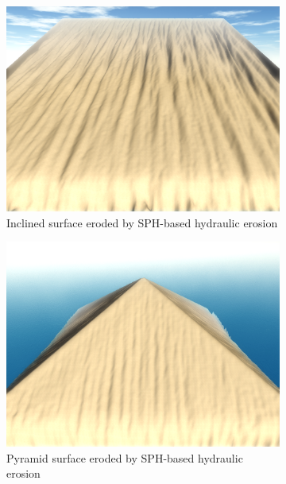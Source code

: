 \documentclass[11pt,a4paper,twoside,openright]{report}
\begin{document}
\begin{figure}[h]
  \centering
  \begin{subfigure}[b]{0.32\textwidth}
    \includegraphics[width=\textwidth]{sph-hydro-10mins-crooked.png}
    \caption{Inclined surface eroded by SPH-based hydraulic erosion}
    \label{fig:hydro4}
  \end{subfigure}
  \begin{subfigure}[b]{0.32\textwidth}
    \includegraphics[width=\textwidth]{sph-hydro-10mins-pyramid.png}
    \caption{Pyramid surface eroded by SPH-based hydraulic erosion}
    \label{fig:hydro5}
  \end{subfigure}
  \begin{subfigure}[b]{0.32\textwidth}

\end{subfigure}
\end{figure}
\end{document}
